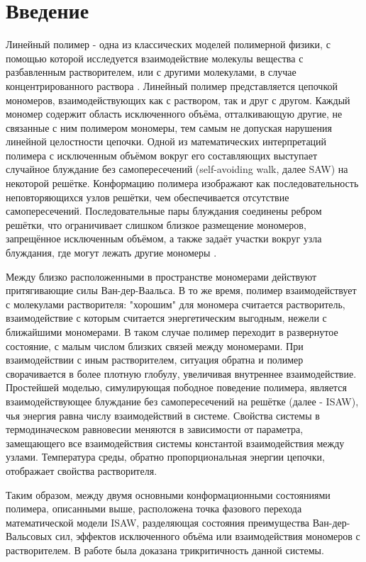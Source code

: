 \section{Введение}

\setcounter{page}{1}

Линейный полимер - одна из классических моделей полимерной физики, 
с помощью которой исследуется взаимодействие молекулы вещества с разбавленным растворителем, 
или с другими молекулами, в случае концентрированного раствора \cite{Gennes1979}.
Линейный полимер представляется цепочкой мономеров, взаимодействующих как с раствором, так и друг с другом.
Каждый мономер содержит область исключенного объёма, отталкивающую другие, не связанные с ним полимером мономеры, 
тем самым не допуская нарушения линейной целостности цепочки.
Одной из математических интерпретаций полимера с исключенным объёмом вокруг его составляющих выступает случайное блуждание без самопересечений (self-avoiding walk, далее SAW) на некоторой решётке.
Конформацию полимера изображают как последовательность неповторяющихся узлов решётки, чем обеспечивается отсутствие самопересечений.
Последовательные пары блуждания соединены ребром решётки, что ограничивает слишком близкое размещение мономеров, запрещённое исключенным объёмом, а также задаёт участки вокруг узла блуждания, где могут лежать другие мономеры \cite{Gennes1979, Vanderzande1998}.

Между близко расположенными в пространстве мономерами действуют притягивающие
силы Ван-дер-Ваальса.
В то же время, полимер взаимодействует с молекулами растворителя:
"хорошим" для мономера считается растворитель, взаимодействие с которым считается энергетическим выгодным, нежели с ближайшими мономерами.
В таком случае полимер переходит в развернутое состояние, с малым числом близких связей между мономерами.
При взаимодействии с иным растворителем, ситуация обратна и полимер сворачивается в более плотную глобулу, увеличивая внутреннее взаимодействие.
Простейшей моделью, симулирующая пободное поведение полимера, является взаимодействующее блуждание без самопересечений на решётке
(далее - ISAW), чья энергия равна числу взаимодействий в системе. 
Свойства системы в термодиначеском равновесии меняются в зависимости от параметра, замещающего все взаимодействия системы константой взаимодействия между узлами.
Температура среды, обратно пропорциональная энергии цепочки, отображает свойства растворителя.

Таким образом, между двумя основными конформационными состояниями полимера, описанными выше, 
расположена точка фазового перехода математической модели ISAW, разделяющая состояния преимущества Ван-дер-Вальсовых сил, эффектов исключенного объёма или взаимодействия мономеров с растворителем.
В работе \cite{Gennes1979} была доказана трикритичность данной системы.

